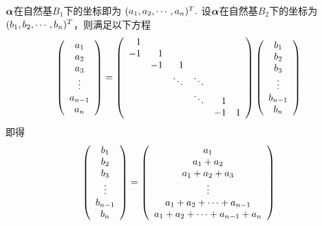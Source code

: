 \begin{jie}
$\boldsymbol{\alpha}$在自然基$B_1$下的坐标即为
$
(a_1,a_2,\cdots,a_n)^T.
$
设$\boldsymbol{\alpha}$在自然基$B_2$下的坐标为$(b_1,b_2,\cdots,b_n)^T$，则满足以下方程
$$
\left(
\begin{array}{c}
a_1\\
a_2\\
a_3\\
\vdots\\
a_{n-1}\\
a_n
\end{array}
\right)=\left(
\begin{array}{rrrrrr}
1  &    &   &  &   & \\
-1 & 1  &   &  &   & \\
   & -1 & 1 &  &   & \\
   &    & \ddots  & \ddots &   & \\
   &    &   & \ddots & 1 &\\
   &    &   &  & -1&1\\
\end{array}
\right)\left(
\begin{array}{c}
b_1\\
b_2\\
b_3\\
\vdots\\
b_{n-1}\\
b_n
\end{array}
\right)
$$
即得
$$
\left(
\begin{array}{c}
b_1\\
b_2\\
b_3\\
\vdots\\
b_{n-1}\\
b_n
\end{array}
\right)=\left(
\begin{array}{c}
a_1\\
a_1+a_2\\
a_1+a_2+a_3\\
\vdots\\
a_1+a_2+\cdots+a_{n-1}\\
a_1+a_2+\cdots+a_{n-1}+a_n
\end{array}
\right)
$$
\end{jie}




